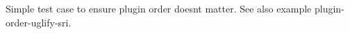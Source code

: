 Simple test case to ensure plugin order doesn\textquotesingle{}t matter. See also example {\ttfamily plugin-\/order-\/uglify-\/sri}. 